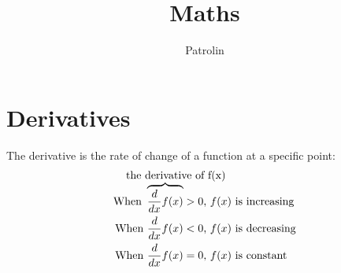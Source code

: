 \documentclass[a4paper,14pt,twoside]{book}
\begin{document}
\newcommand*{\REF}[1]{\hyperref[{#1}]{\autoref*{#1} \nameref*{#1}}}
\newcommand{\LIM}[2]{\lim_{#1 \to #2}}
\newcommand{\D}{\F{d}{dx}}
\newcommand{\DD}[2]{\F{d #1}{d #2}}
\newcommand{\B}[1]{\left(#1\right)}
\newcommand{\F}[2]{\frac{#1}{#2}}
\newcommand{\T}[1]{\text{#1}}
\newcommand{\UB}[2]{\underbrace{#1}_{\N{#2}}}
\newcommand{\OB}[2]{\overbrace{#1}^{\N{#2}}}
\newcommand{\N}[1]{{\fontsize{10}{1cm}\selectfont \rlap{#1}}}
\newcommand*{\QED}{\hfill\ensuremath{\blacksquare}}

\title{Maths}
\author{Patrolin}

{\fontsize{14.4}{1cm}\selectfont
\maketitle
\tableofcontents
\chapter{Derivatives}
The derivative is the rate of change of a function at a specific point$:$
\begin{align*}
	\T{When } \overbrace{\D f(x)}^{\N{the derivative of f(x)}} & > 0 \T{, } f(x) \T{ is increasing} \\
	\T{When } \D f(x)                                          & < 0 \T{, } f(x) \T{ is decreasing} \\
	\T{When } \D f(x)                                          & = 0 \T{, } f(x) \T{ is constant}
\end{align*}
\pagebreak
}
\end{document}
